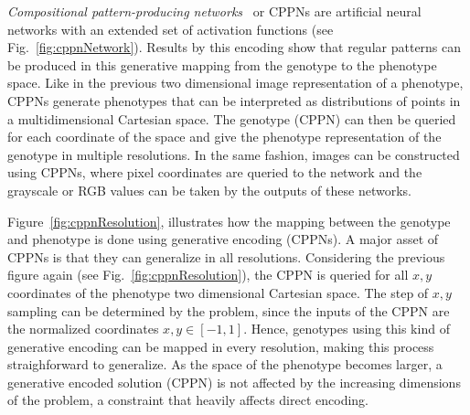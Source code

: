\emph{Compositional pattern-producing networks}~\citep{stanley2007compositional} or CPPNs are artificial neural networks with an extended set of activation functions (see Fig.~\ref{fig:cppnNetwork}). Results by this encoding show that regular patterns can be produced in this generative mapping from the genotype to the phenotype space. Like in the previous two dimensional image representation of a phenotype, CPPNs generate phenotypes that can be interpreted as distributions of points in a multidimensional Cartesian space. The genotype (CPPN) can then be queried for each coordinate of the space and give the phenotype representation of the genotype in multiple resolutions. In the same fashion, images can be constructed using CPPNs, where pixel coordinates are queried to the network and the grayscale or RGB values can be taken by the outputs of these networks. 


Figure~\ref{fig:cppnResolution}, illustrates how the mapping between the genotype and phenotype is done using generative encoding (CPPNs). A major asset of CPPNs is that they can generalize in all resolutions. Considering the previous figure again (see Fig.~\ref{fig:cppnResolution}), the CPPN is queried for all $x,y$ coordinates of the phenotype two dimensional Cartesian space. The step of $x,y$ sampling can be determined by the problem, since the inputs of the CPPN are the normalized coordinates $x,y \in [-1,1]$. Hence, genotypes using this kind of generative encoding can be mapped in every resolution, making this process straighforward to generalize. As the space of the phenotype becomes larger, a generative encoded solution (CPPN) is not affected by the increasing dimensions of the problem, a constraint that heavily affects direct encoding.

